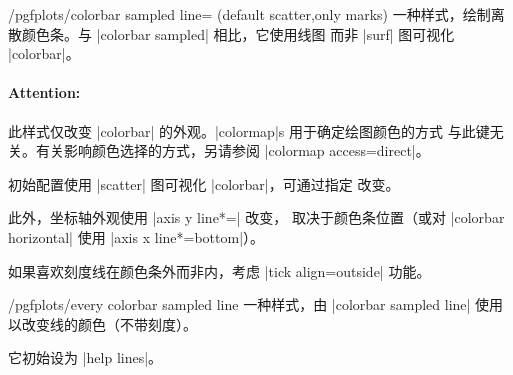 \begin{stylekey}{/pgfplots/colorbar sampled line= (default scatter,only marks)}
    一种样式，绘制离散颜色条。与 |colorbar sampled| 相比，它使用线图
    而非 |surf| 图可视化 |colorbar|。
\begin{codeexample}[]
\end{codeexample}

    \paragraph{Attention:}

    此样式仅改变 |colorbar| 的外观。|colormap|s 用于确定绘图颜色的方式
    与此键无关。有关影响颜色选择的方式，另请参阅
    |colormap access=direct|。

    初始配置使用 |scatter| 图可视化 |colorbar|，可通过指定 
    改变。

    此外，坐标轴外观使用 |axis y line*=| 改变，
    取决于颜色条位置（或对 |colorbar horizontal| 使用
    |axis x line*=bottom|）。

    如果喜欢刻度线在颜色条外而非内，考虑 |tick align=outside| 功能。

    \begin{stylekey}{/pgfplots/every colorbar sampled line}
        一种样式，由 |colorbar sampled line| 使用以改变线的颜色（不带刻度）。

        它初始设为 |help lines|。
    \end{stylekey}
\end{stylekey}

